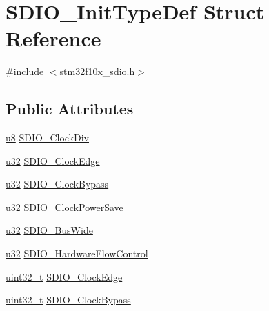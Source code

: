 \hypertarget{struct_s_d_i_o___init_type_def}{}\section{S\+D\+I\+O\+\_\+\+Init\+Type\+Def Struct Reference}
\label{struct_s_d_i_o___init_type_def}


{\ttfamily \#include $<$stm32f10x\+\_\+sdio.\+h$>$}

\subsection*{Public Attributes}
\begin{DoxyCompactItemize}
\item 
\hyperlink{agilefox_2library_2inc_2stm32f10x__type_8h_aed742c436da53c1080638ce6ef7d13de}{u8} \hyperlink{struct_s_d_i_o___init_type_def_ae6fb06712b9e8debe6379fa43dae3cad}{S\+D\+I\+O\+\_\+\+Clock\+Div}
\item 
\hyperlink{agilefox_2library_2inc_2stm32f10x__type_8h_a2caf5cd7bcdbe1eefa727f44ffb10bac}{u32} \hyperlink{struct_s_d_i_o___init_type_def_ae0a4b905228cff9700d91c9543541455}{S\+D\+I\+O\+\_\+\+Clock\+Edge}
\item 
\hyperlink{agilefox_2library_2inc_2stm32f10x__type_8h_a2caf5cd7bcdbe1eefa727f44ffb10bac}{u32} \hyperlink{struct_s_d_i_o___init_type_def_a7ac344acae747568176fba3d309d511f}{S\+D\+I\+O\+\_\+\+Clock\+Bypass}
\item 
\hyperlink{agilefox_2library_2inc_2stm32f10x__type_8h_a2caf5cd7bcdbe1eefa727f44ffb10bac}{u32} \hyperlink{struct_s_d_i_o___init_type_def_a3cac4098adcb4e2d79f44e4b6de83d05}{S\+D\+I\+O\+\_\+\+Clock\+Power\+Save}
\item 
\hyperlink{agilefox_2library_2inc_2stm32f10x__type_8h_a2caf5cd7bcdbe1eefa727f44ffb10bac}{u32} \hyperlink{struct_s_d_i_o___init_type_def_a954fed94888ea6ec96c2c2faed4cb594}{S\+D\+I\+O\+\_\+\+Bus\+Wide}
\item 
\hyperlink{agilefox_2library_2inc_2stm32f10x__type_8h_a2caf5cd7bcdbe1eefa727f44ffb10bac}{u32} \hyperlink{struct_s_d_i_o___init_type_def_a6f3f4d10673f654cb14d36c0c5ed69e3}{S\+D\+I\+O\+\_\+\+Hardware\+Flow\+Control}
\item 
\hyperlink{_p_e___types_8h_a33594304e786b158f3fb30289278f5af}{uint32\+\_\+t} \hyperlink{struct_s_d_i_o___init_type_def_a3252c846b68988b8ae70ca0d40030a52}{S\+D\+I\+O\+\_\+\+Clock\+Edge}
\item 
\hyperlink{_p_e___types_8h_a33594304e786b158f3fb30289278f5af}{uint32\+\_\+t} \hyperlink{struct_s_d_i_o___init_type_def_a6a06a65a5630b21da261f46125cb20b1}{S\+D\+I\+O\+\_\+\+Clock\+Bypass}

\end{DoxyCompactItemize}
